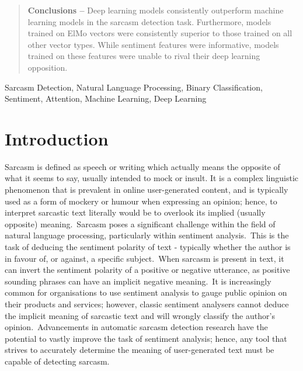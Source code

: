 \documentclass[12pt,a4paper]{article}
\begin{document}
\begin{abstract}
\noindent \textbf{Conclusions --} Deep learning models consistently outperform machine learning models in the sarcasm detection task. Furthermore, models trained on ElMo vectors were consistently superior to those trained on all other vector types. While sentiment features were informative, models trained on these features were unable to rival their deep learning opposition.

\end{abstract}\vspace{-10pt}

\begin{keywords}
Sarcasm Detection, Natural Language Processing, Binary Classification, Sentiment, Attention, Machine Learning, Deep Learning
\end{keywords}\vspace{-8pt}

\section{Introduction}\vspace{-4.2pt}
\noindent Sarcasm is defined as speech or writing which actually means the opposite of what it seems to say, usually intended to mock or insult\footnotemark[1]. It is a complex linguistic phenomenon that is prevalent in online user-generated content, and is typically used as a form of mockery or humour when expressing an opinion; hence, to interpret sarcastic text literally would be to overlook its implied (usually opposite) meaning.\ Sarcasm poses a significant challenge within the field of natural language processing, particularly within sentiment analysis.\ This is the task of deducing the sentiment polarity of text - typically whether the author is in favour of, or against, a specific subject.\ When sarcasm is present in text, it can invert the sentiment polarity of a positive or negative utterance, as positive sounding phrases can have an implicit negative meaning.\ It is increasingly common for organisations to use sentiment analysis to gauge public opinion on their products and services; however, classic sentiment analysers cannot deduce the implicit meaning of sarcastic text and will wrongly classify the author's opinion.\ Advancements in automatic sarcasm detection research have the potential to vastly improve the task of sentiment analysis; hence, any tool that strives to accurately determine the meaning of user-generated text must be capable of detecting sarcasm.
\end{document}
